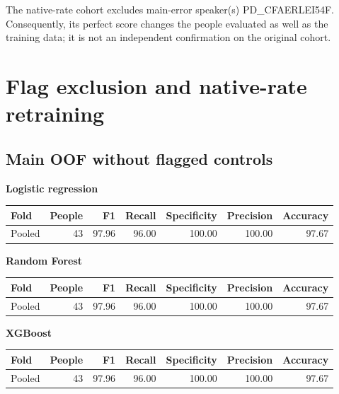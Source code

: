 \documentclass[11pt,a4paper]{article}
\begin{document}
The native-rate cohort excludes main-error speaker(s) PD\_CFAERLEI54F. Consequently, its perfect score changes the people evaluated as well as the training data; it is not an independent confirmation on the original cohort.

\clearpage\section{Flag exclusion and native-rate retraining}
\subsection*{Main OOF without flagged controls}
\textbf{Logistic regression}\begin{center}\small\begin{tabular}{lrrrrrr}\toprule Fold & People & F1 & Recall & Specificity & Precision & Accuracy\\\midrule
Pooled & 43 & 97.96 & 96.00 & 100.00 & 100.00 & 97.67\\\bottomrule\end{tabular}\end{center}
\textbf{Random Forest}\begin{center}\small\begin{tabular}{lrrrrrr}\toprule Fold & People & F1 & Recall & Specificity & Precision & Accuracy\\\midrule
Pooled & 43 & 97.96 & 96.00 & 100.00 & 100.00 & 97.67\\\bottomrule\end{tabular}\end{center}
\textbf{XGBoost}\begin{center}\small\begin{tabular}{lrrrrrr}\toprule Fold & People & F1 & Recall & Specificity & Precision & Accuracy\\\midrule
Pooled & 43 & 97.96 & 96.00 & 100.00 & 100.00 & 97.67\\\bottomrule\end{tabular}\end{center}
\end{document}
